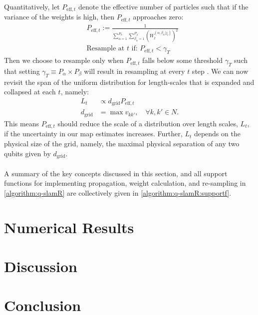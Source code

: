 Quantitatively, let $P_{\mathrm{eff},t}$ denote the effective number of particles such that if the variance of the weights is high, then $P_{\mathrm{eff},t}$ approaches zero:
\begin{align}
& P_{\mathrm{eff},t} := \frac{1}{\sum_{\alpha=1}^{P_\alpha} \sum_{\beta_\alpha=1}^{P_\beta} \left( W_t^{(\alpha, \beta_\alpha | j_t)} \right)^2} \label{eqn:slam:PF:11} \\
&\textrm{Resample at $t$ if:  }  P_{\mathrm{eff},t} < \gamma_{T}  \label{eqn:slam:PF:12}
\end{align}Then we choose to resample only when $P_{\mathrm{eff},t}$ falls below some threshold $\gamma_{T}$ such that setting $\gamma_{T} \equiv P_\alpha \times P_\beta$ will result in resampling at every $t$ step \cite{li2015resampling}. We can now revisit the span of the uniform distribution for length-scales that is expanded and collapsed at each $t$, namely:
\begin{align}
L_t & \propto  d_{\mathrm{grid}} P_{\mathrm{eff}, t} \label{eqn:slam:PF:13}\\  
d_{\mathrm{grid}} &= \max v_{k k'}, \quad \forall k, k' \in N. \label{eqn:slam:PF:14}
\end{align}
This means $P_{\mathrm{eff}, t} $ should reduce the  scale of a distribution over length scales, $L_t$, if the uncertainty in our map estimates increases. Further, $L_t$ depends on the physical size of the grid, namely, the maximal physical separation of any two qubits given by $d_{\mathrm{grid}}$. \\
\\
A summary of the key concepts discussed in this section, and all support functions for implementing propagation, weight calculation, and re-sampling  in \cref{algorithm:q-slamR} are collectively given in \cref{algorithm:q-slamR:supportf}. 

\section{Numerical Results}
\section{Discussion}
\section{Conclusion}








